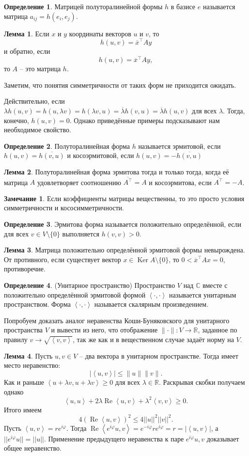 \documentclass[10pt,a4paper,oneside]{book} %
\theoremstyle{definition}
\newtheorem*{rem}{Замечание}
\newtheorem*{defn}{Определение}
\newtheorem{lem}{Лемма}
\newcommand{\mb}[1]{\mathbb{#1}}
\newcommand{\ovl}{\overline}
\DeclareMathOperator{\Ker}{Ker}
\renewcommand{\Re}{\operatorname{Re}}
\def\ffi{\varphi}
\def\lan{\left\langle }
\def\ran{\right\rangle}
\def\dfn{\begin{defn}}
\def\edfn{\end{defn}}
\def\lm{\begin{lem}}
\def\elm{\end{lem}}
\def\rm{\begin{rem}}
\def\erm{\end{rem}}
\begin{document}
\dfn Матрицей полуторалинейной формы $h$
в базисе $e$ называется матрица $a_{ij}=h(e_i,e_j)$. 
\edfn

\lm Если $x$ и $y$ координаты векторов $u$ и $v$, то $$h(u,v)=\ovl{x}^{\top}Ay$$
и обратно, если $$h(u,v)=\ovl{x}^{\top}Ay,$$
то $A$ -- это матрица $h$.
\elm



Заметим, что понятия симметричности  от таких форм не приходится ожидать.

Действительно, если $\lambda h(u,v)=h(u,\lambda v) = h(\lambda v,u)=\ovl{\lambda}h(v,u)=\ovl{\lambda}h(u,v)$ для всех $\lambda$. Тогда, конечно, $h(u,v)=0$. Однако приведённые примеры подсказывают нам необходимое свойство.

\dfn Полуторалинейная форма $h$ называется эрмитовой, если $h(u,v)=\ovl{h(v,u)}$ и косоэрмитовой, если $h(u,v)=-\ovl{h(v,u)}$
\edfn

\lm Полуторалинейная форма эрмитова тогда и только тогда, когда её матрица $A$ удовлетворяет соотношению $\ovl{A^{\top}}=A$ и косоэрмитова, если $\ovl{A^{\top}}=-A$.
\elm

\rm Если коэффициенты матрицы вещественны, то это просто условия симметричности и кососимметричности.
\erm

\dfn Эрмитова форма называется положительно определённой, если для всех $v\in V\setminus\{0\}$ выполняется $h(v,v)>0$.
\edfn

\lm Матрица положительно определённой эрмитовой формы невырождена.
\proof От противного, если существует вектор $x\in \Ker A\setminus\{0\}$, то $0<\ovl{x}^{\top}Ax = 0$, противоречие.
\endproof
\elm

\dfn(Унитарное пространство) Пространство $V$ над $\mb C$ вместе с положительно определённой эрмитовой формой $\lan \cdot, \cdot \ran$ называется унитарным пространством. Форма $\lan \cdot, \cdot \ran$ называется скалярным произведением. 
\edfn

Попробуем доказать аналог неравенства Коши-Буняковского для унитарного пространства $V$ и вывести из него, что отображение $\|\cdot\| \colon V \to \mb R$, заданное по правилу $v\to \sqrt{\lan v,v\ran}$, так же как и в вещественном случае задаёт  норму на $V$.

\lm Пусть $u,v \in V$ -- два вектора в унитарном пространстве. Тогда имеет место неравенство:
$$|\lan u,v\ran| \leq \|u\| \|v\|.$$
\proof Как и раньше  $\lan u+\lambda v, u+\lambda v\ran \geq 0$ для всех $\lambda \in \mb R$. Раскрывая скобки получаем однако $$\lan u,u\ran +2\lambda \Re\lan u,v\ran +\lambda^2\lan v,v\ran\geq 0.$$  Итого имеем  $$4(\Re\lan u,v\ran)^2 \leq 4 ||u||^2||v||^2.$$
Пусть $\lan u ,v \ran = r e^{i\ffi}$. Тогда $\Re \lan  e^{i\ffi}u , v \ran= e^{-i\ffi} r e^{i\ffi}=r=|\lan u,v\ran|$, а $||e^{i\ffi}u||=||u||$. Применение предыдущего неравенства  к паре $e^{i\ffi} u, v$ доказывает общее неравенство.
\endproof
\elm
\end{document}
